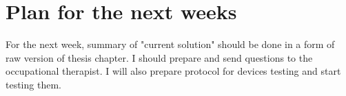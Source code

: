 \documentclass[10pt,a4paper]{article}
\begin{document}
\section*{Plan for the next weeks}
For the next week, summary of "current solution" should be done in a form of raw version of thesis chapter. I should prepare and send questions to the occupational therapist. I will also prepare protocol for devices testing and start testing them. 
 

\end{document}
